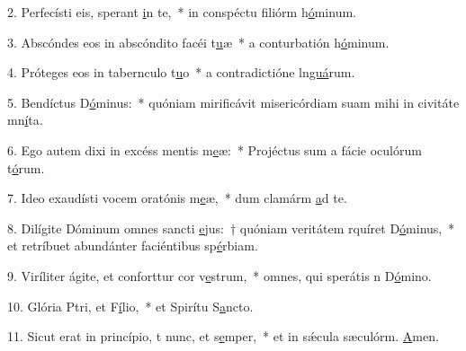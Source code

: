 2. Perfecísti eis,  sperant \uline{i}n te,~* in conspéctu filiórm h\uline{ó}minum.\par 
3. Abscóndes eos in abscóndito facéi t\uline{u}æ~* a conturbatión h\uline{ó}minum.\par 
4. Próteges eos in tabernculo t\uline{u}o~* a contradictióne ln\uline{guá}rum.\par 
5. Bendíctus D\uline{ó}minus:~* quóniam mirificávit misericórdiam suam mihi in civitáte mn\uline{í}ta.\par 
6. Ego autem dixi in excéss mentis m\uline{e}æ:~* Projéctus sum a fácie oculórum t\uline{ó}rum.\par 
7. Ideo exaudísti vocem oratónis m\uline{e}æ,~* dum clamárm \uline{a}d te.\par 
8. Dilígite Dóminum omnes sancti \uline{e}jus:~† quóniam veritátem rquíret D\uline{ó}minus,~* et retríbuet abundánter faciéntibus sp\uline{é}rbiam.\par 
9. Viríliter ágite, et conforttur cor v\uline{e}strum,~* omnes, qui sperátis n D\uline{ó}mino.\par 
10. Glória Ptri, et F\uline{í}lio,~* et Spirítu S\uline{a}ncto.\par 
11. Sicut erat in princípio, t nunc, et s\uline{e}mper,~* et in sǽcula sæculórm. \uline{A}men.\par 
